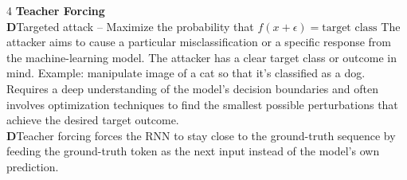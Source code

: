 \documentclass[8pt]{extarticle}
\newcommand{\dtag}{\textcolor{definitioncolor}{\tiny\textbf{D}}\;}
\begin{document}
\begin{multicols}{4}
\vspace{2pt}\textbf{Teacher Forcing}\\
\dtag Targeted attack -- Maximize the probability that $f(x + \epsilon) = \text{target class}$ The attacker aims to cause a particular misclassification or a specific response from the machine-learning model. The attacker has a clear target class or outcome in mind. Example: manipulate image of a cat so that it's classified as a dog. Requires a deep understanding of the model's decision boundaries and often involves optimization techniques to find the smallest possible perturbations that achieve the desired target outcome.\\
\dtag Teacher forcing forces the RNN to stay close to the ground-truth sequence by feeding the ground-truth token as the next input instead of the model's own prediction.\\

\end{multicols}
\end{document}
